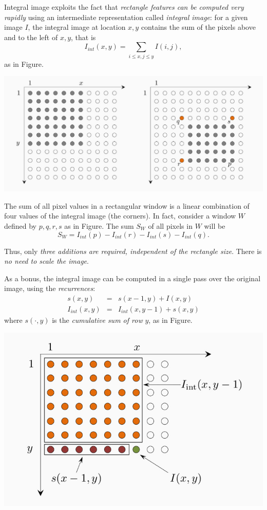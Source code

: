 \documentclass[10pt]{report}
\begin{document}
Integral image exploits the fact that \emph{rectangle features can be computed very rapidly} using an intermediate representation called \emph{integral image}: for a given image \(I\), the integral image at location \(x, y\) contains the sum of the pixels above and to the left of \(x, y\), that is $$I_{int}(x, y) = \sum_{i \leq x, j \leq y} I(i,j),$$ as in Figure.

\begin{center}
\includegraphics[width=.9\linewidth]{./pics/recog/integral-image-1.jpg}
\end{center}

The sum of all pixel values in a rectangular window is a linear combination of four values of the integral image (the corners). In fact, consider a window \(W\) defined by \(p, q, r, s\) as in Figure. The sum \(S_W\) of all pixels in \(W\) will be $$S_W = I_{int}(p) - I_{int}(r) - I_{int}(s) - I_{int}(q).$$

Thus, only \emph{three additions are required, independent of the rectangle size}. There is \emph{no need to scale the image}.

As a bonus, the integral image can be computed in a single pass over the original image, using the \emph{recurrences}:
\begin{eqnarray}\nonumber
s(x,y) & = & s(x-1,y) + I(x,y) \\\nonumber
I_{int}(x,y) & = & I_{int}(x, y-1) + s(x,y)
\end{eqnarray}
where \(s(\cdot,y)\) is the \emph{cumulative sum of row} \(y\), as in Figure.

\begin{center}
\includegraphics[width=.9\linewidth]{./pics/recog/integral-image-2.jpg}
\end{center}
\end{document}
